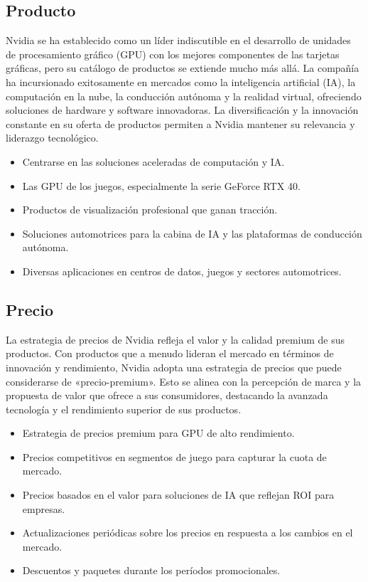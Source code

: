 \documentclass{article}
\begin{document}
\subsection{Producto}

Nvidia se ha establecido como un líder indiscutible en el desarrollo de unidades de procesamiento gráfico (GPU) con los mejores componentes de las tarjetas gráficas, pero su catálogo de productos se extiende mucho más allá. La compañía ha incursionado exitosamente en mercados como la inteligencia artificial (IA), la computación en la nube, la conducción autónoma y la realidad virtual, ofreciendo soluciones de hardware y software innovadoras. La diversificación y la innovación constante en su oferta de productos permiten a Nvidia mantener su relevancia y liderazgo tecnológico.

\begin{itemize}
  \item Centrarse en las soluciones aceleradas de computación y IA.
  \item Las GPU de los juegos, especialmente la serie GeForce RTX 40.
  \item Productos de visualización profesional que ganan tracción.
  \item Soluciones automotrices para la cabina de IA y las plataformas de conducción autónoma.
  \item Diversas aplicaciones en centros de datos, juegos y sectores automotrices.
\end{itemize}

\subsection{Precio}

La estrategia de precios de Nvidia refleja el valor y la calidad premium de sus productos. Con productos que a menudo lideran el mercado en términos de innovación y rendimiento, Nvidia adopta una estrategia de precios que puede considerarse de «precio-premium». Esto se alinea con la percepción de marca y la propuesta de valor que ofrece a sus consumidores, destacando la avanzada tecnología y el rendimiento superior de sus productos.

\begin{itemize}
  \item Estrategia de precios premium para GPU de alto rendimiento.
  \item Precios competitivos en segmentos de juego para capturar la cuota de mercado.
  \item Precios basados en el valor para soluciones de IA que reflejan ROI para empresas.
  \item Actualizaciones periódicas sobre los precios en respuesta a los cambios en el mercado.
  \item Descuentos y paquetes durante los períodos promocionales.
\end{itemize}
\end{document}
